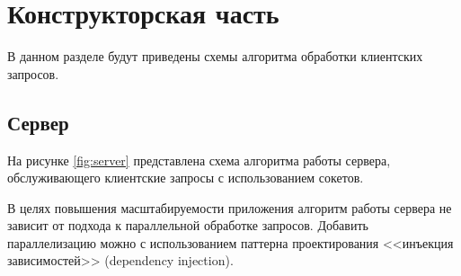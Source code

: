 \chapter{Конструкторская часть}

В данном разделе будут приведены схемы алгоритма обработки клиентских запросов.

\section{Сервер}

На рисунке \ref{fig:server} представлена схема алгоритма работы сервера, обслуживающего клиентские запросы с использованием сокетов.

В целях повышения масштабируемости приложения алгоритм работы сервера не зависит от подхода к параллельной обработке запросов. Добавить параллелизацию можно с использованием паттерна проектирования <<инъекция зависимостей>> (dependency injection).

